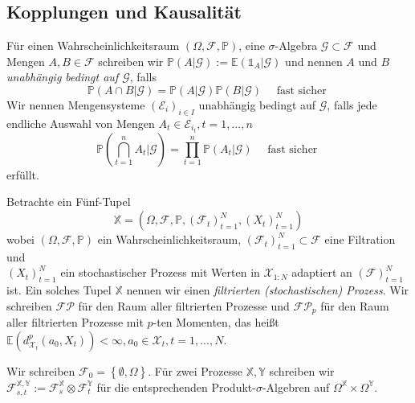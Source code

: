 \subsection{Kopplungen und Kausalität}
\begin{definition}
    Für einen Wahrscheinlichkeitsraum $(\Omega, \mathcal{F}, \mathbb{P})$, eine $\sigma$-Algebra $\mathcal{G} \subset \mathcal{F}$ und Mengen $A, B \in \mathcal{F}$ schreiben wir $\mathbb{P}(A \vert \mathcal{G}) := \mathbb{E}(\mathds{1}_A\vert \mathcal{G})$ und nennen $A$ und $B$ \emph{unabhängig bedingt auf $\mathcal{G}$}, falls
    \begin{equation}\label{eq:def_cond_ind}
    \mathbb{P}(A\cap B\vert \mathcal{G}) = \mathbb{P}(A\vert \mathcal{G}) \mathbb{P}(B \vert \mathcal{G}) \quad \text{ fast sicher }
    \end{equation}
    Wir nennen Mengensysteme $(\mathcal{E}_i)_{i\in I}$ unabhängig bedingt auf $\mathcal{G}$, falls jede endliche Auswahl von Mengen $A_t \in \mathcal{E}_{i_t}, t=1,...,n$ 
    $$\mathbb{P}\left(\bigcap_{t=1}^n A_t\vert \mathcal{G}\right) = \prod_{t=1}^n \mathbb{P}(A_t \vert \mathcal{G}) \quad \text{ fast sicher }$$
    erfüllt.
\end{definition}
\begin{definition}
Betrachte ein Fünf-Tupel
$$\mathbb{X}=\left(\Omega, \mathcal{F}, \mathbb{P}, \left(\mathcal{F}_t\right)_{t=1}^N, \left(X_t\right)_{t=1}^N\right)$$
wobei $(\Omega, \mathcal{F}, \mathbb{P})$ ein Wahrscheinlichkeitsraum, $\left(\mathcal{F}_t\right)_{t=1}^N\subset \mathcal{F}$ eine Filtration und \\
$(X_t)_{t=1}^N$ ein stochastischer Prozess mit Werten in $\mathcal{X}_{1:N}$ adaptiert an $(\mathcal{F})_{t=1}^N$ ist. Ein solches Tupel $\mathbb{X}$ nennen wir einen \emph{filtrierten (stochastischen) Prozess}. Wir schreiben $\mathcal{FP}$ für den Raum aller filtrierten Prozesse und $\mathcal{FP}_p$ für den Raum aller filtrierten Prozesse mit $p$-ten Momenten, das heißt $\mathbb{E}(d^p_{\mathcal{X}_t}(a_0, X_t))<\infty, a_0\in\mathcal{X}_t, t=1,...,N$.
\end{definition}
Wir schreiben $\mathcal{F}_0 = \left\{\emptyset, \Omega\right\}$. Für zwei Prozesse $\mathbb{X}, \mathbb{Y}$ schreiben wir $\mathcal{F}_{s,t}^\mathbb{X,Y} := \mathcal{F}_s^\mathbb{X} \otimes \mathcal{F}_t^\mathbb{Y}$ für die entsprechenden Produkt-$\sigma$-Algebren auf $\Omega^\mathbb{X}\times\Omega^\mathbb{Y}$.
